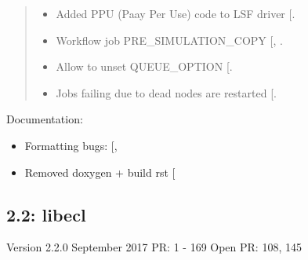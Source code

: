 \documentclass[a4paper,10pt,english]{sphinxmanual}
\begin{document}
\begin{quote}
\begin{itemize}
\item {} 
Added PPU (Paay Per Use) code to LSF driver {[}\sphinxhref{https://github.com/Statoil/res/pull/71/}{71}{]}.

\item {} 
Workflow job PRE\_SIMULATION\_COPY {[}, \sphinxhref{https://github.com/Statoil/res/pull/88/}{88}{]}.

\item {} 
Allow to unset QUEUE\_OPTION {[}\sphinxhref{https://github.com/Statoil/res/pull/87/}{87}{]}.

\item {} 
Jobs failing due to dead nodes are restarted {[}\sphinxhref{https://github.com/Statoil/res/pull/100/}{100}{]}.

\end{itemize}
\end{quote}

Documentation:
\begin{itemize}
\item {} 
Formatting bugs: {[}, \sphinxhref{https://github.com/Statoil/res/pull/50/}{50}{]}

\item {} 
Removed doxygen + build rst {[}\sphinxhref{https://github.com/Statoil/res/pull/29/}{29}{]}

\end{itemize}


\subsection{2.2: libecl}
\label{\detokenize{changes/index:id117}}
Version 2.2.0 September 2017 PR: 1 - 169
Open PR: 108, 145
\end{document}
